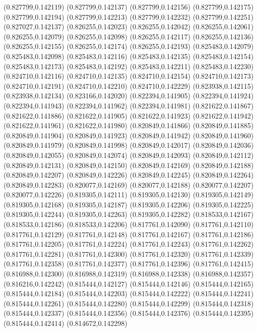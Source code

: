 (0.827799,0.142119)
(0.827799,0.142137)
(0.827799,0.142156)
(0.827799,0.142175)
(0.827799,0.142194)
(0.827799,0.142213)
(0.827799,0.142232)
(0.827799,0.142251)
(0.827027,0.142137)
(0.826255,0.142023)
(0.826255,0.142042)
(0.826255,0.142061)
(0.826255,0.142079)
(0.826255,0.142098)
(0.826255,0.142117)
(0.826255,0.142136)
(0.826255,0.142155)
(0.826255,0.142174)
(0.826255,0.142193)
(0.825483,0.142079)
(0.825483,0.142098)
(0.825483,0.142116)
(0.825483,0.142135)
(0.825483,0.142154)
(0.825483,0.142173)
(0.825483,0.142192)
(0.825483,0.142211)
(0.825483,0.142230)
(0.824710,0.142116)
(0.824710,0.142135)
(0.824710,0.142154)
(0.824710,0.142173)
(0.824710,0.142191)
(0.824710,0.142210)
(0.824710,0.142229)
(0.823938,0.142115)
(0.823938,0.142134)
(0.823166,0.142020)
(0.822394,0.141905)
(0.822394,0.141924)
(0.822394,0.141943)
(0.822394,0.141962)
(0.822394,0.141981)
(0.821622,0.141867)
(0.821622,0.141886)
(0.821622,0.141905)
(0.821622,0.141923)
(0.821622,0.141942)
(0.821622,0.141961)
(0.821622,0.141980)
(0.820849,0.141866)
(0.820849,0.141885)
(0.820849,0.141904)
(0.820849,0.141923)
(0.820849,0.141942)
(0.820849,0.141960)
(0.820849,0.141979)
(0.820849,0.141998)
(0.820849,0.142017)
(0.820849,0.142036)
(0.820849,0.142055)
(0.820849,0.142074)
(0.820849,0.142093)
(0.820849,0.142112)
(0.820849,0.142131)
(0.820849,0.142150)
(0.820849,0.142169)
(0.820849,0.142188)
(0.820849,0.142207)
(0.820849,0.142226)
(0.820849,0.142245)
(0.820849,0.142264)
(0.820849,0.142283)
(0.820077,0.142169)
(0.820077,0.142188)
(0.820077,0.142207)
(0.820077,0.142226)
(0.819305,0.142111)
(0.819305,0.142130)
(0.819305,0.142149)
(0.819305,0.142168)
(0.819305,0.142187)
(0.819305,0.142206)
(0.819305,0.142225)
(0.819305,0.142244)
(0.819305,0.142263)
(0.819305,0.142282)
(0.818533,0.142167)
(0.818533,0.142186)
(0.818533,0.142206)
(0.817761,0.142090)
(0.817761,0.142110)
(0.817761,0.142129)
(0.817761,0.142148)
(0.817761,0.142167)
(0.817761,0.142186)
(0.817761,0.142205)
(0.817761,0.142224)
(0.817761,0.142243)
(0.817761,0.142262)
(0.817761,0.142281)
(0.817761,0.142300)
(0.817761,0.142320)
(0.817761,0.142339)
(0.817761,0.142358)
(0.817761,0.142377)
(0.817761,0.142396)
(0.817761,0.142415)
(0.816988,0.142300)
(0.816988,0.142319)
(0.816988,0.142338)
(0.816988,0.142357)
(0.816216,0.142242)
(0.815444,0.142127)
(0.815444,0.142146)
(0.815444,0.142165)
(0.815444,0.142184)
(0.815444,0.142203)
(0.815444,0.142222)
(0.815444,0.142241)
(0.815444,0.142261)
(0.815444,0.142280)
(0.815444,0.142299)
(0.815444,0.142318)
(0.815444,0.142337)
(0.815444,0.142356)
(0.815444,0.142376)
(0.815444,0.142395)
(0.815444,0.142414)
(0.814672,0.142298)
